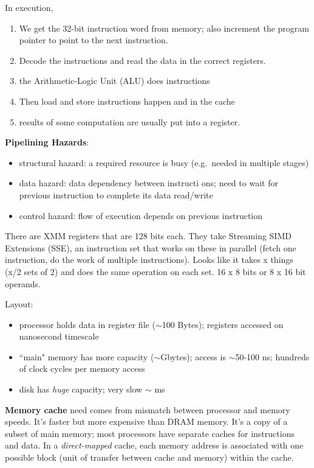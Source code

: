 \documentclass[12pt,twoside]{article}
\begin{document}
In execution, 
\begin{enumerate}
  \item We get the 32-bit instruction word from memory; also increment the program pointer to point to the next instruction. 
  \item Decode the instructions and read the data in the correct registers.  
  \item the Arithmetic-Logic Unit (ALU) does instructions
  \item Then load and store instructions happen and in the cache
  \item results of some computation are usually put into a register.
\end{enumerate}

\textbf{Pipelining Hazards}:
\begin{itemize}
  \item structural hazard: a required resource is busy (e.g.\ needed in multiple stages) 
  \item data hazard: data dependency between instructi
  ons; need to wait for previous instruction to complete its data read/write
  \item control hazard: flow of execution depends on previous instruction
\end{itemize}

There are XMM registers that are 128 bits each. They take Streaming SIMD Extensions (SSE), an instruction set that works on these in parallel (fetch one instruction, do the work of multiple instructions). Looks like it takes x things (x/2 sets of 2) and does the same operation on each set. 16 x 8 bits or 8 x 16 bit operands.

Layout: 
\begin{itemize}
  \item processor holds data in register file ($\sim$100 Bytes); registers accessed on nanosecond timescale
  \item ``main" memory has more capacity ($\sim$Gbytes); access is $\sim$50-100 ns; hundreds of clock cycles per memory access
  \item disk has \textit{huge} capacity; very slow $\sim$ ms
\end{itemize}	

\textbf{Memory cache} need comes from mismatch between processor and memory speeds. 
It's faster but more expensive than DRAM memory.
It's a copy of a subset of main memory; most processors have separate caches for instructions and data.
In a \textit{direct-mapped} cache, each memory address is associated with one possible block (unit of transfer between cache and memory) within the cache.
\end{document}

